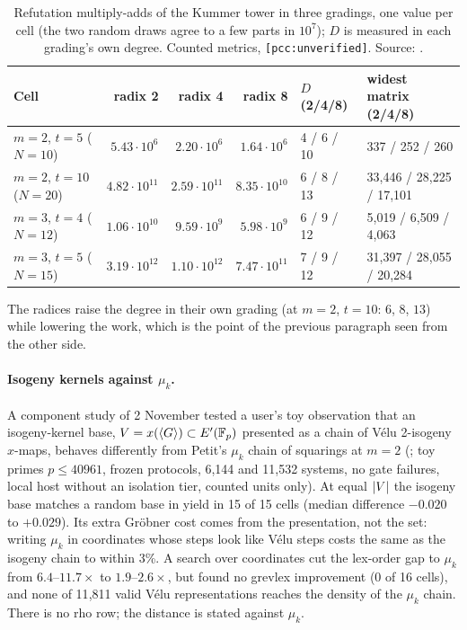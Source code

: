 \begin{table}[t]
\centering\small
\begin{tabular}{@{}lrrrll@{}}
\toprule
Cell & radix 2 & radix 4 & radix 8 & $D$ (2/4/8) & widest matrix (2/4/8) \\
\midrule
$m=2$, $t=5$ ($N=10$) & $5.43\cdot10^6$ & $2.20\cdot10^6$ & $1.64\cdot10^6$ & 4 / 6 / 10 & 337 / 252 / 260 \\
$m=2$, $t=10$ ($N=20$) & $4.82\cdot10^{11}$ & $2.59\cdot10^{11}$ & $8.35\cdot10^{10}$ & 6 / 8 / 13 & 33{,}446 / 28{,}225 / 17{,}101 \\
$m=3$, $t=4$ ($N=12$) & $1.06\cdot10^{10}$ & $9.59\cdot10^9$ & $5.98\cdot10^9$ & 6 / 9 / 12 & 5{,}019 / 6{,}509 / 4{,}063 \\
$m=3$, $t=5$ ($N=15$) & $3.19\cdot10^{12}$ & $1.10\cdot10^{12}$ & $7.47\cdot10^{11}$ & 7 / 9 / 12 & 31{,}397 / 28{,}055 / 20{,}284 \\
\bottomrule
\end{tabular}
\caption[]{Refutation multiply-adds of the Kummer tower in three gradings,
one value per cell (the two random draws agree to a few parts in $10^7$);
$D$ is measured in each grading's own degree. Counted metrics,
\texttt{[pcc:unverified]}. Source:
.}
\label{tab:pa-radix}
\end{table} The radices raise the degree in their own
grading (at $m=2$, $t=10$: $6$, $8$, $13$) while lowering the work, which is
the point of the previous paragraph seen from the other side.

\paragraph{Isogeny kernels against $\mu_k$.} A component study of 2
November tested a user's toy observation that an isogeny-kernel base,
$V=x(\langle G\rangle)\subset E'(\mathbb{F}_p)$ presented as a chain of V\'elu
2-isogeny $x$-maps, behaves differently from Petit's $\mu_k$ chain of
squarings at $m=2$ (;
toy primes $p\le40961$, frozen protocols, 6{,}144 and 11{,}532 systems, no
gate failures, local host without an isolation tier, counted units only).
At equal $\lvert V \rvert$ the isogeny base matches a random base in yield in 15 of 15
cells (median difference $-0.020$ to $+0.029$). Its extra Gr\"obner cost
comes from the presentation, not the set: writing $\mu_k$ in coordinates
whose steps look like V\'elu steps costs the same as the isogeny chain to
within 3\%. A search over coordinates cut the lex-order gap to $\mu_k$ from
$6.4$--$11.7\times$ to $1.9$--$2.6\times$, but found no grevlex improvement
(0 of 16 cells), and none of 11{,}811 valid V\'elu representations reaches
the density of the $\mu_k$ chain. There is no rho row; the distance is
stated against $\mu_k$.

